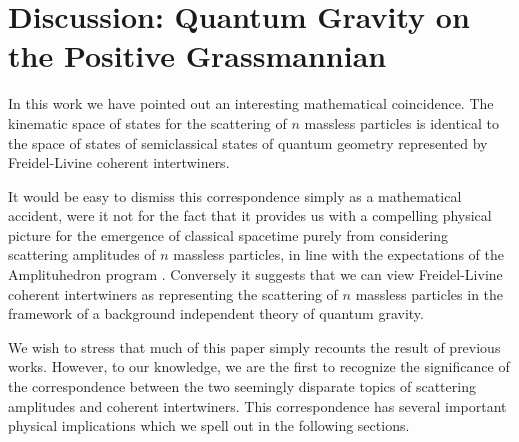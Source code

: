 \documentclass[twocolumn,final,aps,nofootinbib,nobibnotes]{revtex4-2}
\begin{document}
\section{Discussion: Quantum Gravity on the Positive Grassmannian}\label{sec:discussion}

In this work we have pointed out an interesting mathematical coincidence. The kinematic space of states for the scattering of $ n $ massless particles is identical to the space of states of semiclassical states of quantum geometry represented by Freidel-Livine coherent intertwiners.

It would be easy to dismiss this correspondence simply as a mathematical accident, were it not for the fact that it provides us with a compelling physical picture for the emergence of classical spacetime purely from considering scattering amplitudes of $ n $ massless particles, in line with the expectations of the Amplituhedron program \cite{Arkani-Hamed2014The-Amplituhedron}. Conversely it suggests that we can view Freidel-Livine coherent intertwiners as representing the scattering of $ n $ massless particles in the framework of a background independent theory of quantum gravity.

We wish to stress that much of this paper simply recounts the result of previous works. However, to our knowledge, we are the first to recognize the significance of the correspondence between the two seemingly disparate topics of scattering amplitudes and coherent intertwiners. This correspondence has several important physical implications which we spell out in the following sections.


\end{document}
